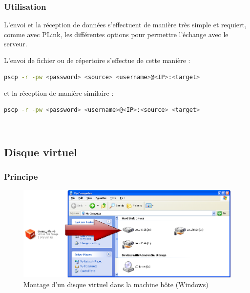 
\subsubsection{Utilisation}

L'envoi et la réception de données s'effectuent de manière très simple et requiert, comme avec PLink, les différentes options pour permettre l'échange avec le serveur.

L'envoi de fichier ou de répertoire s'effectue de cette manière :
\begin{lstlisting}[language = sh]
pscp -r -pw <password> <source> <username>@<IP>:<target>
\end{lstlisting}
et la réception de manière similaire :
\begin{lstlisting}[language = sh]
pscp -r -pw <password> <username>@<IP>:<source> <target>
\end{lstlisting}
~~\\





\subsection{Disque virtuel}


\subsubsection{Principe}

\begin{figure}[!h]
	\center
	\includegraphics[scale=0.45]{images/Montage_Windows.png}
	\caption{Montage d'un disque virtuel dans la machine hôte (Windows)}
	\label{Montage Windows}
\end{figure}

